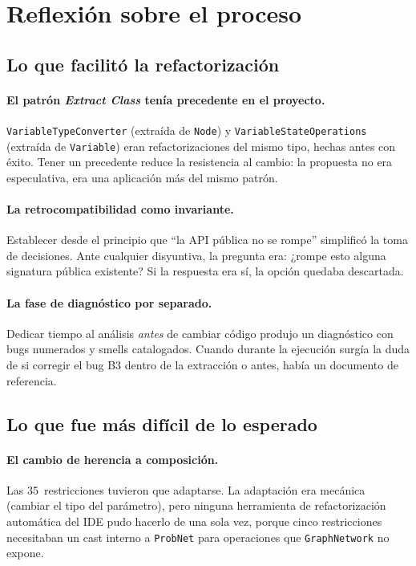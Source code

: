 \documentclass[11pt,a4paper]{article}
\newcommand{\code}[1]{\texttt{#1}}
\begin{document}
\section{Reflexión sobre el proceso}
\label{sec:reflexion}

\subsection{Lo que facilitó la refactorización}

\paragraph{El patrón \emph{Extract Class} tenía precedente en el proyecto.}
\code{VariableTypeConverter} (extraída de \code{Node}) y
\code{VariableStateOperations} (extraída de \code{Variable}) eran
refactorizaciones del mismo tipo, hechas antes con éxito.  Tener un
precedente reduce la resistencia al cambio: la propuesta no era
especulativa, era una aplicación más del mismo patrón.

\paragraph{La retrocompatibilidad como invariante.}
Establecer desde el principio que ``la API pública no se rompe'' simplificó
la toma de decisiones.  Ante cualquier disyuntiva, la pregunta era: ¿rompe
esto alguna signatura pública existente?  Si la respuesta era sí, la
opción quedaba descartada.

\paragraph{La fase de diagnóstico por separado.}
Dedicar tiempo al análisis \emph{antes} de cambiar código produjo un
diagnóstico con bugs numerados y smells catalogados.  Cuando durante la
ejecución surgía la duda de si corregir el bug B3 dentro de la extracción
o antes, había un documento de referencia.

\subsection{Lo que fue más difícil de lo esperado}

\paragraph{El cambio de herencia a composición.}
Las 35~restricciones tuvieron que adaptarse.  La adaptación era mecánica
(cambiar el tipo del parámetro), pero ninguna herramienta de
refactorización automática del IDE pudo hacerlo de una sola vez, porque
cinco restricciones necesitaban un cast interno a \code{ProbNet} para
operaciones que \code{GraphNetwork} no expone.
\end{document}
